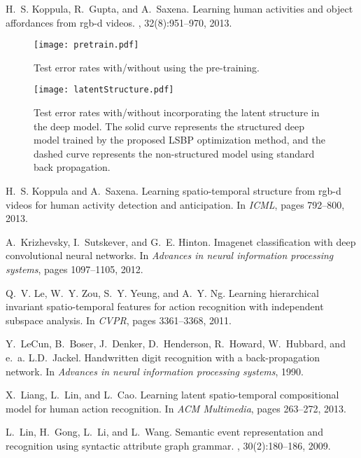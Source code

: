 \documentclass{sig-alternate}
\begin{document}
\begin{thebibliography}{40}
H.~S. Koppula, R.~Gupta, and A.~Saxena.
\newblock Learning human activities and object affordances from rgb-d videos.
,
  32(8):951--970, 2013.

\begin{figure}[!htb]
\centering
\texttt{[image: pretrain.pdf]}
\caption{Test error rates with/without using the pre-training.}\label{fig:pretrain}
\end{figure}

\begin{figure}[!htb]
\centering
\texttt{[image: latentStructure.pdf]}
\caption{Test error rates with/without incorporating the latent structure in the deep model. The solid curve represents the structured deep model trained by the proposed LSBP optimization method, and the dashed curve represents the non-structured model using standard back propagation.}\label{fig:latentStruct}
\end{figure}

H.~S. Koppula and A.~Saxena.
\newblock Learning spatio-temporal structure from rgb-d videos for human
  activity detection and anticipation.
\newblock In {\em ICML}, pages 792--800, 2013.

A.~Krizhevsky, I.~Sutskever, and G.~E. Hinton.
\newblock Imagenet classification with deep convolutional neural networks.
\newblock In {\em Advances in neural information processing systems}, pages
  1097--1105, 2012.

Q.~V. Le, W.~Y. Zou, S.~Y. Yeung, and A.~Y. Ng.
\newblock Learning hierarchical invariant spatio-temporal features for action
  recognition with independent subspace analysis.
\newblock In {\em CVPR}, pages 3361--3368, 2011.

Y.~LeCun, B.~Boser, J.~Denker, D.~Henderson, R.~Howard, W.~Hubbard, and e.~a.
  L.D.~Jackel.
\newblock Handwritten digit recognition with a back-propagation network.
\newblock In {\em Advances in neural information processing systems}, 1990.

X.~Liang, L.~Lin, and L.~Cao.
\newblock Learning latent spatio-temporal compositional model for human action
  recognition.
\newblock In {\em ACM Multimedia}, pages 263--272, 2013.

L.~Lin, H.~Gong, L.~Li, and L.~Wang.
\newblock Semantic event representation and recognition using syntactic
  attribute graph grammar.
, 30(2):180--186, 2009.


\end{thebibliography}
\end{document}
